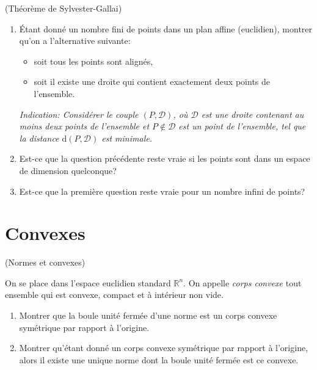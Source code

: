 \documentclass[a4paper,12pt,reqno]{amsart}
\begin{document}
\begin{exo} (Théorème de Sylvester-Gallai)
  \begin{enumerate}
    \item Étant donné un nombre fini de points dans un plan affine (euclidien), montrer qu'on a l'alternative suivante:
      \begin{itemize}
        \item soit tous les points sont alignés,
        \item soit il existe une droite qui contient exactement deux points de l'ensemble.
      \end{itemize}
      \emph{Indication: Considérer le couple $(P,\mathcal{D})$, où $\mathcal{D}$ est une droite contenant au moins deux points de l'ensemble et $P\notin \mathcal{D}$ est un point de l'ensemble, tel que la distance $\mathrm{d}(P,\mathcal{D})$ est minimale.}

    \item Est-ce que la question précédente reste vraie si les points sont dans un espace de dimension quelconque?

    \item Est-ce que la première question reste vraie pour un nombre infini de points?
  \end{enumerate}
\end{exo}


\section{Convexes}

\begin{exo} (Normes et convexes)

    On se place dans l'espace euclidien standard $\mathbb{R}^{n}$. On appelle \emph{corps convexe} tout ensemble qui est convexe, compact et à intérieur non vide.
    \begin{enumerate}
       \item Montrer que la boule unité fermée d'une norme est un corps convexe symétrique par rapport à l'origine.

       \item Montrer qu'étant donné un corps convexe symétrique par rapport à l'origine, alors il existe une unique norme dont la boule unité fermée est ce convexe.

     \end{enumerate}
\end{exo}
\end{document}
